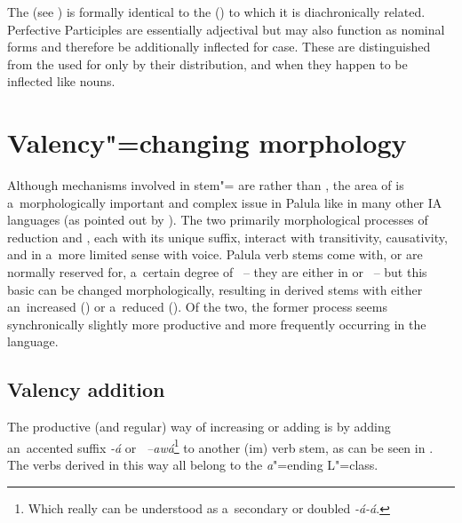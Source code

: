 The   (see ) is formally identical to the   () to which it is diachronically related. Perfective Participles are essentially adjectival but may also function as nominal forms and therefore be additionally inflected for case. These are distinguished from the  used for   only by their distribution, and when they happen to be inflected like nouns.


\section{Valency"=changing morphology}
\label{sec:8-5}

Although mechanisms involved in stem"= are  rather than , the area of  is a~morphologically important and complex issue in Palula like in many other IA languages (as pointed out by \citealt[315]{masica1991}). The two primarily morphological processes of  reduction and , each with its unique suffix, interact with transitivity, causativity, and in a~more limited sense with voice. Palula verb stems come with, or are normally reserved for, a~certain degree of ~-- they are either in or ~-- but this basic  can be changed morphologically, resulting in derived stems with either an~increased  () or a~reduced  (). Of the two, the former process seems synchronically slightly more productive and more frequently occurring in the language.


\subsection{Valency addition}
\label{subsec:8-5-1}

The productive (and regular) way of increasing or adding  is by adding an~accented suffix
\textit{-á} or \textit{~--awá}\footnote{Which really can be understood as a~secondary or
  doubled  \textit{-á-á}.} to another (im) verb stem, as can be seen in
. The verbs derived in this way all belong to the \textit{a}"=ending L"=class.


